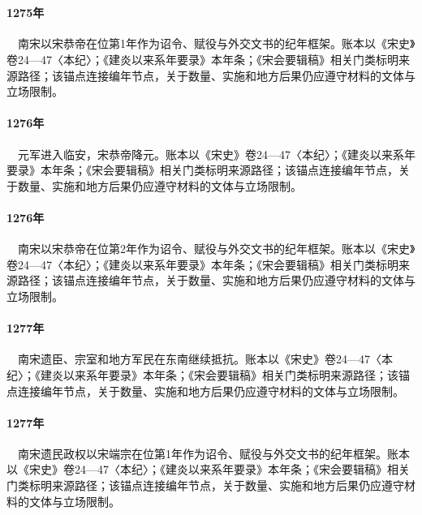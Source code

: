 \section{}

\paragraph{1275年}　南宋以宋恭帝在位第1年作为诏令、赋役与外交文书的纪年框架。账本以《宋史》卷24—47〈本纪〉；《建炎以来系年要录》本年条；《宋会要辑稿》相关门类标明来源路径；该锚点连接编年节点，关于数量、实施和地方后果仍应遵守材料的文体与立场限制。

\paragraph{1276年}　元军进入临安，宋恭帝降元。账本以《宋史》卷24—47〈本纪〉；《建炎以来系年要录》本年条；《宋会要辑稿》相关门类标明来源路径；该锚点连接编年节点，关于数量、实施和地方后果仍应遵守材料的文体与立场限制。

\paragraph{1276年}　南宋以宋恭帝在位第2年作为诏令、赋役与外交文书的纪年框架。账本以《宋史》卷24—47〈本纪〉；《建炎以来系年要录》本年条；《宋会要辑稿》相关门类标明来源路径；该锚点连接编年节点，关于数量、实施和地方后果仍应遵守材料的文体与立场限制。

\paragraph{1277年}　南宋遗臣、宗室和地方军民在东南继续抵抗。账本以《宋史》卷24—47〈本纪〉；《建炎以来系年要录》本年条；《宋会要辑稿》相关门类标明来源路径；该锚点连接编年节点，关于数量、实施和地方后果仍应遵守材料的文体与立场限制。

\paragraph{1277年}　南宋遗民政权以宋端宗在位第1年作为诏令、赋役与外交文书的纪年框架。账本以《宋史》卷24—47〈本纪〉；《建炎以来系年要录》本年条；《宋会要辑稿》相关门类标明来源路径；该锚点连接编年节点，关于数量、实施和地方后果仍应遵守材料的文体与立场限制。

